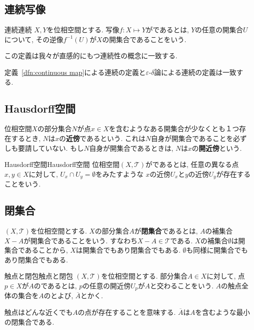 \documentclass[../main]{subfiles}
\begin{document}
    \subsection{連続写像}
        \begin{dfn}[label=dfn:continuous map]{連続}{連続}
            $X,Y$を位相空間とする. 写像$f:X \mapsto Y$がであるとは, $Y$の任意の開集合$U$について, その逆像$f^{-1}(U)$が$X$の開集合であることをいう. 
        \end{dfn}
        この定義は我々が直感的にもつ連続性の概念に一致する. 
        \begin{prop}{}{}
            定義~\ref{dfn:continuous map}による連続の定義と$\varepsilon$-$\delta$論による連続の定義は一致する.
        \end{prop}
        
    \subsection{Hausdorff空間}
        位相空間$X$の部分集合$N$が点$x \in X$を含むようなある開集合が少なくとも１つ存在するとき, $N$は$x$の\textbf{近傍}であるという. これは$N$自身が開集合であることを必ずしも要請していない. もし$N$自身が開集合であるときは, $N$は$x$の\textbf{開近傍}という. 
        \begin{dfn}{Hausdorff空間}{Hausdorff空間}
            位相空間$(X,\mathcal{T})$がであるとは, 任意の異なる点$x,y \in X$に対して, $U_x \cap U_y = \emptyset$をみたすような $x$の近傍$U_x$と$y$の近傍$U_y$が存在することをいう. 
        \end{dfn}
        
    \subsection{閉集合}
        $(X,\mathcal{T})$を位相空間とする. $X$の部分集合$A$が\textbf{閉集合}であるとは, $A$の補集合$X-A$が開集合であることをいう. すなわち$X-A\in\mathcal{T}$である. $X$の補集合$\emptyset$は開集合であることから, $X$は開集合でもあり閉集合でもある. $\emptyset$も同様に開集合でもあり閉集合でもある. 
        
        \begin{dfn}{触点と閉包}{触点と閉包}
            $(X,\mathcal{T})$を位相空間とする. 部分集合$A \in X$に対して, 点$p \in X$が$A$のであるとは, $p$の任意の開近傍$U_p$が$A$と交わることをいう. 
            $A$の触点全体の集合を$A$のとよび, $\overline{A}$とかく. 
        \end{dfn}
        触点はどんな近くでも$A$の点が存在することを意味する. $\overline{A}$は$A$を含むような最小の閉集合である. 
        
\end{document}
